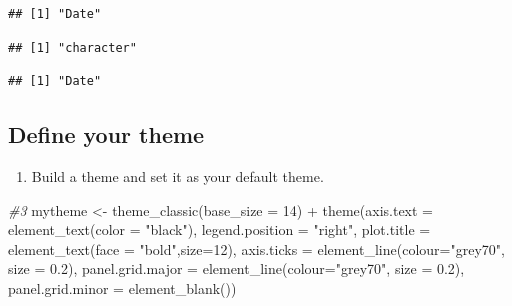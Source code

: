 \documentclass[
]{article}
\newenvironment{Shaded}{\begin{snugshade}}{\end{snugshade}}
\newcommand{\AttributeTok}[1]{\textcolor[rgb]{0.77,0.63,0.00}{#1}}
\newcommand{\CommentTok}[1]{\textcolor[rgb]{0.56,0.35,0.01}{\textit{#1}}}
\newcommand{\DecValTok}[1]{\textcolor[rgb]{0.00,0.00,0.81}{#1}}
\newcommand{\FloatTok}[1]{\textcolor[rgb]{0.00,0.00,0.81}{#1}}
\newcommand{\FunctionTok}[1]{\textcolor[rgb]{0.00,0.00,0.00}{#1}}
\newcommand{\NormalTok}[1]{#1}
\newcommand{\OtherTok}[1]{\textcolor[rgb]{0.56,0.35,0.01}{#1}}
\newcommand{\SpecialCharTok}[1]{\textcolor[rgb]{0.00,0.00,0.00}{#1}}
\newcommand{\StringTok}[1]{\textcolor[rgb]{0.31,0.60,0.02}{#1}}
\providecommand{\tightlist}{%
  \setlength{\itemsep}{0pt}\setlength{\parskip}{0pt}}
\begin{document}
\begin{verbatim}
## [1] "Date"
\end{verbatim}

\begin{Shaded}
\end{Shaded}

\begin{verbatim}
## [1] "character"
\end{verbatim}

\begin{Shaded}
\end{Shaded}

\begin{verbatim}
## [1] "Date"
\end{verbatim}

\hypertarget{define-your-theme}{%
\subsection{Define your theme}\label{define-your-theme}}

\begin{enumerate}
\def\labelenumi{\arabic{enumi}.}
\setcounter{enumi}{2}
\tightlist
\item
  Build a theme and set it as your default theme.
\end{enumerate}

\begin{Shaded}
\begin{Highlighting}[]
\CommentTok{\#3}
\NormalTok{mytheme }\OtherTok{\textless{}{-}} \FunctionTok{theme\_classic}\NormalTok{(}\AttributeTok{base\_size =} \DecValTok{14}\NormalTok{) }\SpecialCharTok{+}
  \FunctionTok{theme}\NormalTok{(}\AttributeTok{axis.text =} \FunctionTok{element\_text}\NormalTok{(}\AttributeTok{color =} \StringTok{"black"}\NormalTok{), }
        \AttributeTok{legend.position =} \StringTok{"right"}\NormalTok{,}
        \AttributeTok{plot.title =} \FunctionTok{element\_text}\NormalTok{(}\AttributeTok{face =} \StringTok{"bold"}\NormalTok{,}\AttributeTok{size=}\DecValTok{12}\NormalTok{),}
        \AttributeTok{axis.ticks =} \FunctionTok{element\_line}\NormalTok{(}\AttributeTok{colour=}\StringTok{"grey70"}\NormalTok{, }\AttributeTok{size =} \FloatTok{0.2}\NormalTok{),}
        \AttributeTok{panel.grid.major =} \FunctionTok{element\_line}\NormalTok{(}\AttributeTok{colour=}\StringTok{"grey70"}\NormalTok{, }\AttributeTok{size =} \FloatTok{0.2}\NormalTok{),}
        \AttributeTok{panel.grid.minor =} \FunctionTok{element\_blank}\NormalTok{())}
\end{Highlighting}
\end{Shaded}
\end{document}
